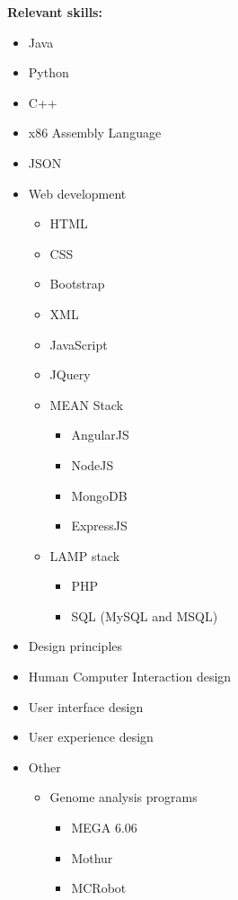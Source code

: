 \documentclass[12pt,a4paper]{article}
\begin{document}
		\parbox{\textwidth}{
			\textbf{\small Relevant skills:}
			\begin{itemize}\itemsep0em
				\item Java
				\item Python
				\item C++
				\item x86 Assembly Language 
				\item JSON
				\item Web development
				\begin {itemize}\itemsep0em
					\item HTML
					\item CSS
					\item Bootstrap
					\item XML
					\item JavaScript
					\item JQuery
					\item MEAN Stack
					\begin {itemize}\itemsep0em
						\item AngularJS
						\item NodeJS
						\item MongoDB
						\item ExpressJS
					\end {itemize}
					\item LAMP stack
					\begin {itemize}\itemsep0em
						\item PHP
						\item SQL (MySQL and MSQL)
					\end {itemize}
				\end {itemize}
				\item Design principles
				\item Human Computer Interaction design
				\item User interface design
				\item User experience design
				\item Other 
				\begin {itemize}\itemsep0em
					\item Genome analysis programs 
					\begin {itemize}\itemsep0em
						\item MEGA 6.06
						\item Mothur
						\item MCRobot
					\end {itemize}
				\end {itemize}
			\end{itemize}
		}
\end{document}
